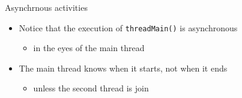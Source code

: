 \documentclass[presentation]{beamer}\mode<presentation>{\usetheme{AMSBolognaFC}}
\begin{document}
\begin{frame}[allowframebreaks]
    \framebreak

    \begin{alertblock}{Asynchrnous activities}
        \begin{itemize}
            \item Notice that the execution of \texttt{threadMain()} is \alert{asynchronous}
            \begin{itemize}
                \item in the eyes of the main thread
            \end{itemize}

            \item The main thread knows when it starts, not when it ends
            \begin{itemize}
                \item unless the second thread is join
            \end{itemize}
        \end{itemize}
    \end{alertblock}
\end{frame}
\end{document}
